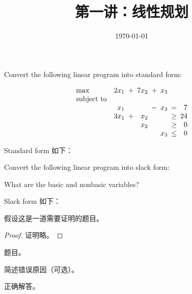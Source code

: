 \documentclass[11pt, a4paper, UTF8]{ctexart}
\title{第一讲：线性规划}
\date{\today}
\begin{document}
\maketitle
\beginthishw	%

\begin{problem}[29.1-4]	%
  Convert the following linear program into standard form:

  \begin{equation*}
	\setlength\arraycolsep{2.5pt}
	\begin{array}{l@{\quad} r c r c r c r}
	  \max          &	2x_1 &+&	7x_2 &+&	x_3 & &	\\
	  \textup{subject to} & & & & & & & \\
	  				&	x_1	& &		&  - & x_3 & = & 7 \\
					&   3x_1 & + & x_2 &  &  & \geq & 24 \\
					&     &  & x_2 & & & \geq & 0  \\ 
					&     &  & & & x_3 & \leq & 0
	\end{array}
  \end{equation*}
\end{problem}

\begin{solution}
  Standard form 如下：
\end{solution}
\begin{problem}[29.1-5]
  Convert the following linear program into slack form:

  \noindent What are the basic and nonbasic variables?
\end{problem}

\begin{solution}
  Slack form 如下：
\end{solution}
\begin{problem}[xx.x-x]
  假设这是一道需要证明的题目。	
\end{problem}

\begin{proof}
  证明略。	
\end{proof}
\beginlasthw	%

\begin{problem}[28.1-2]
  题目。
\end{problem}

\begin{cause}
  简述错误原因（可选）。
\end{cause}

\begin{solution}
  正确解答。
\end{solution}
\end{document}
